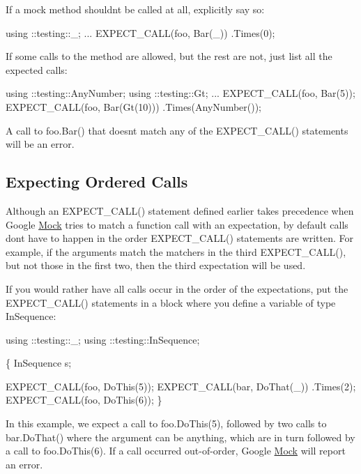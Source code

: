 If a mock method shouldn\textquotesingle{}t be called at all, explicitly say so\+:


\begin{DoxyCode}
using ::testing::\_;
...
  EXPECT\_CALL(foo, Bar(\_))
      .Times(0);
\end{DoxyCode}


If some calls to the method are allowed, but the rest are not, just list all the expected calls\+:


\begin{DoxyCode}
using ::testing::AnyNumber;
using ::testing::Gt;
...
  EXPECT\_CALL(foo, Bar(5));
  EXPECT\_CALL(foo, Bar(Gt(10)))
      .Times(AnyNumber());
\end{DoxyCode}


A call to {\ttfamily foo.\+Bar()} that doesn\textquotesingle{}t match any of the {\ttfamily E\+X\+P\+E\+C\+T\+\_\+\+C\+A\+L\+L()} statements will be an error.

\subsection*{Expecting Ordered Calls}

Although an {\ttfamily E\+X\+P\+E\+C\+T\+\_\+\+C\+A\+L\+L()} statement defined earlier takes precedence when Google \hyperlink{class_mock}{Mock} tries to match a function call with an expectation, by default calls don\textquotesingle{}t have to happen in the order {\ttfamily E\+X\+P\+E\+C\+T\+\_\+\+C\+A\+L\+L()} statements are written. For example, if the arguments match the matchers in the third {\ttfamily E\+X\+P\+E\+C\+T\+\_\+\+C\+A\+L\+L()}, but not those in the first two, then the third expectation will be used.

If you would rather have all calls occur in the order of the expectations, put the {\ttfamily E\+X\+P\+E\+C\+T\+\_\+\+C\+A\+L\+L()} statements in a block where you define a variable of type {\ttfamily In\+Sequence}\+:


\begin{DoxyCode}
using ::testing::\_;
using ::testing::InSequence;

\{
  InSequence s;

  EXPECT\_CALL(foo, DoThis(5));
  EXPECT\_CALL(bar, DoThat(\_))
      .Times(2);
  EXPECT\_CALL(foo, DoThis(6));
\}
\end{DoxyCode}


In this example, we expect a call to {\ttfamily foo.\+Do\+This(5)}, followed by two calls to {\ttfamily bar.\+Do\+That()} where the argument can be anything, which are in turn followed by a call to {\ttfamily foo.\+Do\+This(6)}. If a call occurred out-\/of-\/order, Google \hyperlink{class_mock}{Mock} will report an error.

